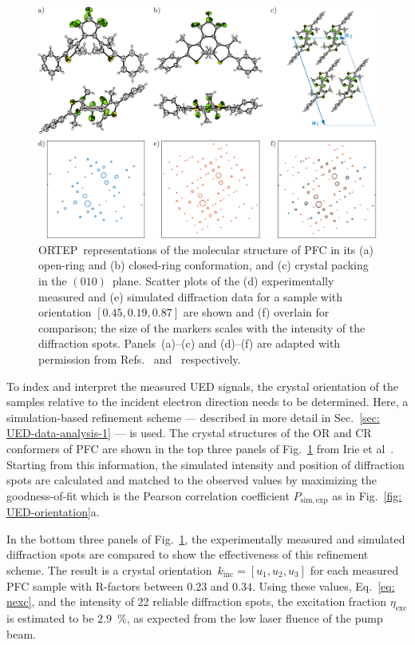 \begin{figure}[ht!]
  \centering
  \includegraphics[width = \textwidth]{Figures/fig_DAE_PFC_structure.pdf}
  \caption[Crystal structure of PFC and orientation determination.]{
    ORTEP~representations of the molecular structure of PFC
    in its (a) open-ring and (b) closed-ring conformation,
    and (c) crystal packing in the $(010)$~plane.
    Scatter plots of the (d) experimentally measured and (e) simulated
    diffraction data for a sample with orientation $[ 0.45, 0.19, 0.87]$ are shown
    and (f) overlain for comparison;
    the size of the markers scales with the intensity of the diffraction spots.
    Panels~(a)--(c) and (d)--(f) are adapted with permission from Refs.~\cite{Irie2001}
    and~\cite{Jean-Ruel2013} respectively.
  }
  \label{fig: DAE-PFC-structure}
\end{figure}

To index and interpret the measured UED signals,
the crystal orientation of the samples relative to the incident electron direction needs to be determined.
Here, a simulation-based refinement scheme
--- described in more detail in Sec.~\ref{sec: UED-data-analysis-1} --- is used.
%
The crystal structures of the OR and CR conformers of PFC are shown
in the top three panels of Fig.~\ref{fig: DAE-PFC-structure} from Irie et al~\cite{Irie2001}.
Starting from this information, the simulated intensity and position of diffraction spots
are calculated and matched to the observed values
by maximizing the goodness-of-fit which is the Pearson correlation coefficient $P_\mathrm{sim, exp}$
as in Fig.~\ref{fig: UED-orientation}a.

In the bottom three panels of Fig.~\ref{fig: DAE-PFC-structure},
the experimentally measured and simulated diffraction spots
are compared to show the effectiveness of this refinement scheme.
%
The result is a crystal orientation~$k_\mathrm{inc} = [ u_1, u_2, u_3]$ for each measured PFC sample
with R-factors between $0.23$ and $0.34$.
%
Using these values, Eq.~\eqref{eq: nexc}, and the intensity of 22 reliable diffraction spots,
the excitation fraction $\eta_\mathrm{exc}$ is estimated to be $2.9$~\%,
as expected from the low laser fluence of the pump beam.

